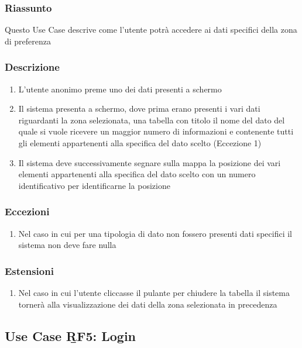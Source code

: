         \subsubsection{Riassunto}
            Questo Use Case descrive come l'utente potrà accedere ai dati specifici della zona di preferenza
        \subsubsection{Descrizione}
            \begin{enumerate}
                \item L'utente anonimo preme uno dei dati presenti a schermo
                \item Il sistema presenta a schermo, dove prima erano presenti i vari dati riguardanti la zona selezionata, una tabella con titolo il nome del dato del quale si vuole ricevere un maggior numero di informazioni e contenente tutti gli elementi appartenenti alla specifica del dato scelto (Eccezione 1)
                \item Il sistema deve successivamente segnare sulla mappa la posizione dei vari elementi appartenenti alla specifica del dato scelto con un numero identificativo per identificarne la posizione
            \end{enumerate}
        \subsubsection{Eccezioni}
            \begin{enumerate}
                \item Nel caso in cui per una tipologia di dato non fossero presenti dati specifici il sistema non deve fare nulla
            \end{enumerate}
        \subsubsection{Estensioni}
            \begin{enumerate}
                \item Nel caso in cui l'utente cliccasse il pulante per chiudere la tabella il sistema tornerà alla visualizzazione dei dati della zona selezionata in precedenza
            \end{enumerate}

    \subsection{Use Case \b{RF5}: Login}
